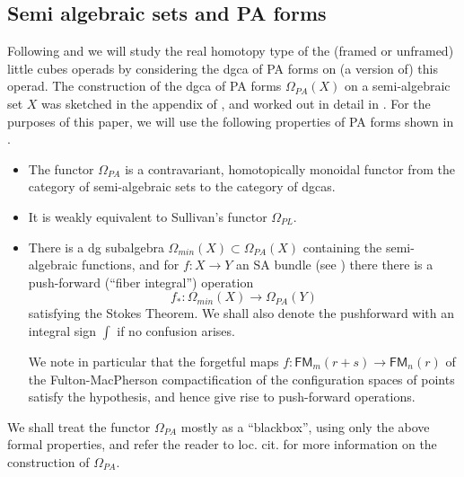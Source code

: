 \documentclass[a4paper]{amsart}
\theoremstyle{plain}
\theoremstyle{definition}
\newcommand{\FM}{\mathsf{FM}}
\begin{document}
\subsection{Semi algebraic sets and PA forms}\label{sec:PAforms}
Following \cite{K2} and \cite{LV} we will study the real homotopy type of the (framed or unframed) little cubes operads by considering the dgca of PA forms on (a version of) this operad.
The construction of the dgca of PA forms $\Omega_{PA}(X)$ on a semi-algebraic set $X$ was sketched in the appendix of \cite{KS}, and worked out in detail in \cite{HLTV}.
For the purposes of this paper, we will use the following properties of PA forms shown in \cite{HLTV}.
\begin{itemize}
\item The functor $\Omega_{PA}$ is a contravariant, homotopically monoidal functor from the category of semi-algebraic sets to the category of dgcas.
\item It is weakly equivalent to Sullivan's functor $\Omega_{PL}$.
\item There is a dg subalgebra $\Omega_{min}(X)\subset \Omega_{PA}(X)$ containing the semi-algebraic functions, and for $f: X\to Y$ an SA bundle (see \cite{HLTV}) there there is a push-forward (``fiber integral'') operation
\[
 f_* : \Omega_{min}(X) \to \Omega_{PA}(Y)
\]
satisfying the Stokes Theorem. We shall also denote the pushforward with an integral sign $\int$ if no confusion arises.

We note in particular that the forgetful maps $f: \FM_m(r+s)\to \FM_n(r)$ of the Fulton-MacPherson compactification of the configuration spaces of points satisfy the hypothesis, and hence give rise to push-forward operations.
\end{itemize}

We shall treat the functor $\Omega_{PA}$ mostly as a ``blackbox'', using only the above formal properties, and refer the reader to loc. cit. for more information on the construction of $\Omega_{PA}$.
\end{document}
